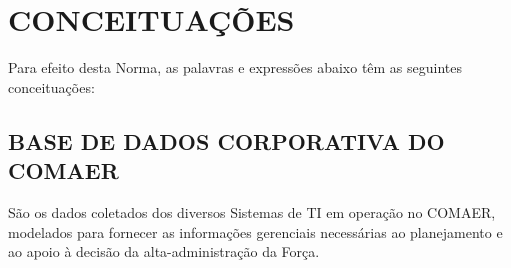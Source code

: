 \chapter{CONCEITUAÇÕES}

    Para efeito desta Norma, as palavras e expressões abaixo têm as seguintes conceituações:
    
    \section{BASE DE DADOS CORPORATIVA DO COMAER}
    
        São os dados coletados dos diversos Sistemas de TI em operação no COMAER, modelados para fornecer as informações gerenciais necessárias ao planejamento e ao apoio à decisão da alta-administração da Força.